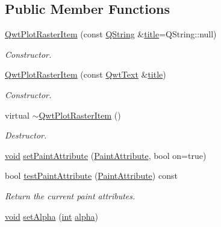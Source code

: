 \subsection*{Public Member Functions}
\begin{DoxyCompactItemize}
\item 
\hyperlink{class_qwt_plot_raster_item_a2149c1d6b71c607027345a9a51ef3314}{Qwt\-Plot\-Raster\-Item} (const \hyperlink{group___u_a_v_objects_plugin_gab9d252f49c333c94a72f97ce3105a32d}{Q\-String} \&\hyperlink{class_qwt_plot_item_a3859d011b670b5f89e45d1ccef9206f7}{title}=Q\-String\-::null)
\begin{DoxyCompactList}\small\item\em Constructor. \end{DoxyCompactList}\item 
\hyperlink{class_qwt_plot_raster_item_af487c6abc8e95200d4537d1373f96be5}{Qwt\-Plot\-Raster\-Item} (const \hyperlink{class_qwt_text}{Qwt\-Text} \&\hyperlink{class_qwt_plot_item_a3859d011b670b5f89e45d1ccef9206f7}{title})
\begin{DoxyCompactList}\small\item\em Constructor. \end{DoxyCompactList}\item 
virtual \hyperlink{class_qwt_plot_raster_item_a2715233827c346ab15504dc75d6e9714}{$\sim$\-Qwt\-Plot\-Raster\-Item} ()
\begin{DoxyCompactList}\small\item\em Destructor. \end{DoxyCompactList}\item 
\hyperlink{group___u_a_v_objects_plugin_ga444cf2ff3f0ecbe028adce838d373f5c}{void} \hyperlink{class_qwt_plot_raster_item_a70d6b94821e5eafb29b1f045d1f3a2e6}{set\-Paint\-Attribute} (\hyperlink{class_qwt_plot_raster_item_a75ac68ea258b8612e8a1893e845394ee}{Paint\-Attribute}, bool on=true)
\item 
bool \hyperlink{class_qwt_plot_raster_item_a17d8f350acf46d2ba7a68df977f80a52}{test\-Paint\-Attribute} (\hyperlink{class_qwt_plot_raster_item_a75ac68ea258b8612e8a1893e845394ee}{Paint\-Attribute}) const 
\begin{DoxyCompactList}\small\item\em Return the current paint attributes. \end{DoxyCompactList}\item 
\hyperlink{group___u_a_v_objects_plugin_ga444cf2ff3f0ecbe028adce838d373f5c}{void} \hyperlink{class_qwt_plot_raster_item_a14f2ab8ec0994384e6269f869c352273}{set\-Alpha} (\hyperlink{ioapi_8h_a787fa3cf048117ba7123753c1e74fcd6}{int} \hyperlink{glext_8h_a55d98ec4b6aa35ace9b91275e7ad847b}{alpha})

\end{DoxyCompactItemize}
